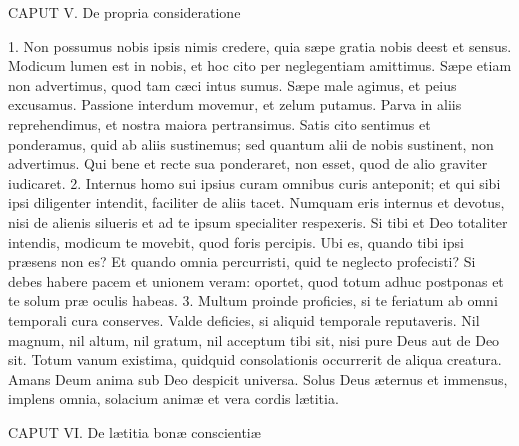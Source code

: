 \documentclass[twoside]{article}
\begin{document}
CAPUT V.
De propria consideratione

1. Non possumus nobis ipsis nimis credere, quia sæpe gratia nobis deest et sensus. Modicum lumen est in nobis, et hoc cito per neglegentiam amittimus. Sæpe etiam non advertimus, quod tam cæci intus sumus. Sæpe male agimus, et peius excusamus. Passione interdum movemur, et zelum putamus. Parva in aliis reprehendimus, et nostra maiora pertransimus. Satis cito sentimus et ponderamus, quid ab aliis sustinemus; sed quantum alii de nobis sustinent, non advertimus. Qui bene et recte sua ponderaret, non esset, quod de alio graviter iudicaret.
2. Internus homo sui ipsius curam omnibus curis anteponit; et qui sibi ipsi diligenter intendit, faciliter de aliis tacet. Numquam eris internus et devotus, nisi de alienis silueris et ad te ipsum specialiter respexeris. Si tibi et Deo totaliter intendis, modicum te movebit, quod foris percipis. Ubi es, quando tibi ipsi præsens non es? Et quando omnia percurristi, quid te neglecto profecisti? Si debes habere pacem et unionem veram: oportet, quod totum adhuc postponas et te solum præ oculis habeas.
3. Multum proinde proficies, si te feriatum ab omni temporali cura conserves. Valde deficies, si aliquid temporale reputaveris. Nil magnum, nil altum, nil gratum, nil acceptum tibi sit, nisi pure Deus aut de Deo sit. Totum vanum existima, quidquid consolationis occurrerit de aliqua creatura. Amans Deum anima sub Deo despicit universa. Solus Deus æternus et immensus, implens omnia, solacium animæ et vera cordis lætitia.


CAPUT VI.
De lætitia bonæ conscientiæ
\end{document}
